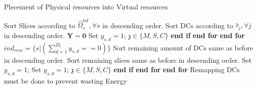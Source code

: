 \documentclass[conference]{IEEEtran}
\begin{document}
\begin{algorithm}
\caption{Plecement of Physical resources into Virtual resources}\label{alg3}
\begin{algorithmic}[1]
\State Sort Slices according to $\hat{\Omega}_{s}^{tot} , \forall s$ in descending order.\label{31}
\State Sort DCs according to $\hat{\tau}_j , \forall j$ in descending order. \label{32}
\State $\boldsymbol{Y} = \boldsymbol{0}$
\label{33}
\State Set $y_{s,d} = 1$;
 $\mathfrak{z}\in \{M,S,C\}$
\EndIf
\State \textbf{end if}
\EndFor
\State \textbf{end for}
\EndFor
\State \textbf{end for} \label{34}
\State  $ind_{rem} = \{s|({\sum_{d=1}^{D_c}y_{s,d}==0})\}$ \label{35}
\State Sort remaining amount of DCs same as before in descending order.
\State Sort remaining slices same as before in descending order.
\State Set $y_{s,d} = 1$;
\State Set $y_{s,d} = 1$;
 $\mathfrak{z}\in \{M,S,C\}$
\EndIf
\State \textbf{end if}
\EndFor
\State \textbf{end for}
\EndFor
\State \textbf{end for} \label{36}
\State Remapping DCs must be done to prevent wasting Energy \label{37}
\end{algorithmic}
\end{algorithm}
\end{document}
